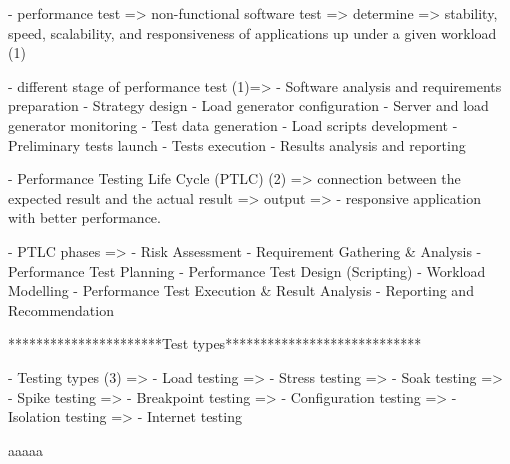 - performance test => non-functional software test => determine => stability, speed, scalability, and responsiveness of applications up under a given workload (1)   

- different stage of performance test (1)=> 
      - Software analysis and requirements preparation
      - Strategy design
      - Load generator configuration
      - Server and load generator monitoring
      - Test data generation
      - Load scripts development
      - Preliminary tests launch
      - Tests execution
      - Results analysis and reporting


- Performance Testing Life Cycle (PTLC) (2) => connection between the expected result and the actual result => output =>
    - responsive application with better performance.

- PTLC phases =>
    - Risk Assessment
    - Requirement Gathering & Analysis
    - Performance Test Planning
    - Performance Test Design (Scripting)
    - Workload Modelling 
    - Performance Test Execution & Result Analysis
    - Reporting and Recommendation

**********************Test types****************************

- Testing types (3) => 
    - Load testing =>
    - Stress testing =>
    - Soak testing => 
    - Spike testing => 
    - Breakpoint testing =>
    - Configuration testing => 
    - Isolation testing =>
    - Internet testing



    aaaaa